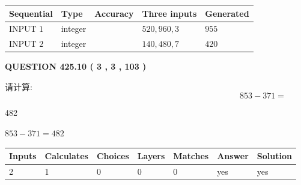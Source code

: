 \documentclass{ctexart}
\begin{document}
   
  
  
\noindent\begin{tabular}{|l|l|l|l|l|}
\hline
 Sequential & Type & Accuracy & Three inputs & Generated \\ 
\hline
 
 
  INPUT $  1 $ & integer &  & $
 520
 , 
 960
 , 
 3
 $ & $ 955 $ 
 \\  \hline  
 
 
  INPUT $  2 $ & integer &  & $
 140
 , 
 480
 , 
 7
 $ & $ 420 $ 
 \\  \hline  
 \end{tabular}
   
   
  
\vspace{0.2in}
  
{\textbf{\Large{QUESTION
425.10 
 ( 3 , 3 , 103 )
}}}
  
  
 
请计算:
\begin{equation}
853 -   %
371 = \nonumber
\end{equation}
 
 
 
\noindent{}
 
 

482
 
 
\noindent{}
 
 

 
 
 
\noindent{}
 
 

$ %
853 -  %
371=   %
482$
 
 
\noindent{}
 
 

 
   
   
   
   
\noindent\begin{tabular}{|l|l|l|l|l|l|l|}
 \hline
Inputs & Calculates & Choices & Layers & Matches & Answer & Solution \\ \hline
 2  & 
 1  & 
 0
  & 
 0  & 
 0  & 
  yes & 
  yes 
  \\ \hline
 \end{tabular}
   
\end{document}
